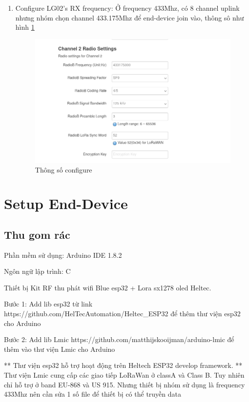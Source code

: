 \begin{enumerate}
    \item Configure LG02's RX frequency: Ở frequency 433Mhz, có 8 channel uplink nhưng nhóm chọn channel 433.175Mhz để end-device join vào, thông sô như hình \ref{fig:radio_config}
    \begin{figure}[H]
        \centering
        \includegraphics[width=\textwidth]{images/Quanh/Radio_config.png}
        \caption{Thông số configure}
        \label{fig:radio_config}
    \end{figure}
\end{enumerate}


\section{Setup End-Device}
\subsection{Thu gom rác}
Phần mềm sử dụng: Arduino IDE 1.8.2

Ngôn ngữ lập trình: C

Thiết bị Kit RF thu phát wifi Blue esp32 + Lora sx1278 oled Heltec.

\begin{description}
    \item Bước 1: Add lib esp32 từ link https://github.com/HelTecAutomation/Heltec\_ESP32 để thêm thư viện esp32 cho Arduino
    \item Bước 2: Add lib Lmic https://github.com/matthijskooijman/arduino-lmic để thêm vào thư viện Lmic cho Arduino
\end{description}

** Thư viện esp32 hỗ trợ hoạt động trên Heltech ESP32 develop framework.
** Thư viện Lmic cung cấp các giao tiếp LoRaWan ở classA và Class B. Tuy nhiên chỉ hỗ trợ ở band EU-868 và US 915. Nhưng thiết bị nhóm sử dụng là frequency 433Mhz nên cần sửa 1 số file để thiết bị có thể truyền data


